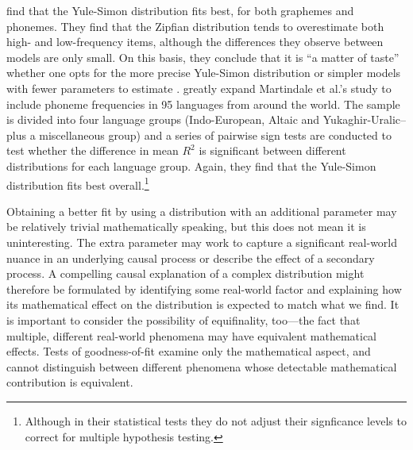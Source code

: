 \textcite{martindale_comparison_1996} find that the Yule-Simon distribution fits best, for both graphemes and phonemes. They find that the Zipfian distribution tends to overestimate both high- and low-frequency items, although the differences they observe between models are only small. On this basis, they conclude that it is ``a matter of taste'' whether one opts for the more precise Yule-Simon distribution or simpler models with fewer parameters to estimate \autocite[p.~111]{martindale_comparison_1996}. \textcite{tambovtsev_phoneme_2007} greatly expand Martindale et al.'s \autocite*{martindale_comparison_1996} study to include phoneme frequencies in 95 languages from around the world. The sample is divided into four language groups (Indo-European, Altaic and Yukaghir-Uralic--plus a miscellaneous group) and a series of pairwise sign tests are conducted to test whether the difference in mean \(R^2\) is significant between different distributions for each language group. Again, they find that the Yule-Simon distribution fits best overall.\footnote{Although in their statistical tests they do not adjust their signficance levels to correct for multiple hypothesis testing.}

Obtaining a better fit by using a distribution with an additional parameter may be relatively trivial mathematically speaking, but this does not mean it is uninteresting. The extra parameter may work to capture a significant real-world nuance in an underlying causal process or describe the effect of a secondary process. A compelling causal explanation of a complex distribution might therefore be formulated by identifying some real-world factor and explaining how its mathematical effect on the distribution is expected to match what we find. It is important to consider the possibility of equifinality, too---the fact that multiple, different real-world phenomena may have equivalent mathematical effects. Tests of goodness-of-fit examine only the mathematical aspect, and cannot distinguish between different phenomena whose detectable mathematical contribution is equivalent.

